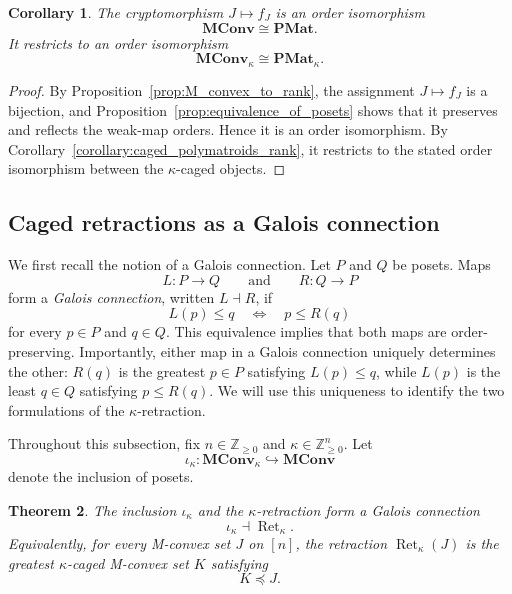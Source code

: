 \documentclass[10pt,a4paper]{amsart}
\newtheorem{theorem}{Theorem}[section]
\newtheorem{corollary}[theorem]{Corollary}
\newcommand{\Zgeq}{\mathbb{Z}_{\geq 0}}       %
\newcommand{\Zgeqn}{\mathbb{Z}_{\geq 0}^n}     %
\newcommand{\PMat}{\mathbf{PMat}}      %
\newcommand{\MConv}{\mathbf{MConv}}    %
\newcommand{\PMatK}{\mathbf{PMat}_\kappa}
\newcommand{\MConvK}{\mathbf{MConv}_\kappa}
\DeclareMathOperator{\Ret}{Ret}                %
\newcommand{\RetK}{\Ret_{\kappa}}              %
\begin{document}
\begin{corollary}\label{corr:equivalence_of_posets}
    The cryptomorphism $J\mapsto f_J$ is an order isomorphism
    \[
        \MConv\cong\PMat.
    \]
    It restricts to an order isomorphism
    \[
        \MConvK\cong\PMatK.
    \]
\end{corollary}

\begin{proof}
    By Proposition~\ref{prop:M_convex_to_rank}, the assignment
    $J\mapsto f_J$ is a bijection, and
    Proposition~\ref{prop:equivalence_of_posets} shows that it preserves
    and reflects the weak-map orders. Hence it is an order isomorphism.
    By Corollary~\ref{corollary:caged_polymatroids_rank}, it restricts to the
    stated order isomorphism between the $\kappa$-caged objects.
\end{proof}

\subsection{Caged retractions as a Galois connection}

We first recall the notion of a Galois connection. Let $P$ and $Q$ be
posets. Maps
\[
    L\colon P\longrightarrow Q
    \qquad\text{and}\qquad
    R\colon Q\longrightarrow P
\]
form a \emph{Galois connection}, written $L\dashv R$, if
\[
    L(p)\leq q
    \quad\Longleftrightarrow\quad
    p\leq R(q)
\]
for every $p\in P$ and $q\in Q$. This equivalence implies that both maps
are order-preserving. Importantly, either map in a Galois connection
uniquely determines the other: $R(q)$ is the greatest $p\in P$ satisfying
$L(p)\leq q$, while $L(p)$ is the least $q\in Q$ satisfying
$p\leq R(q)$. We will use this uniqueness to identify the two formulations
of the $\kappa$-retraction.

Throughout this subsection, fix $n\in\Zgeq$ and
$\kappa\in\Zgeqn$. Let
\[
    \iota_\kappa\colon\MConvK\hookrightarrow\MConv
\]
denote the inclusion of posets.

\begin{theorem}\label{thm:reflection_as_M_convex}
    The inclusion $\iota_\kappa$ and the $\kappa$-retraction form a Galois
    connection
    \[
        \iota_\kappa\dashv\RetK.
    \]
    Equivalently, for every M-convex set $J$ on $[n]$, the retraction
    $\RetK(J)$ is the greatest $\kappa$-caged M-convex set $K$ satisfying
    \[
        K\preceq J.
    \]
\end{theorem}
\end{document}
